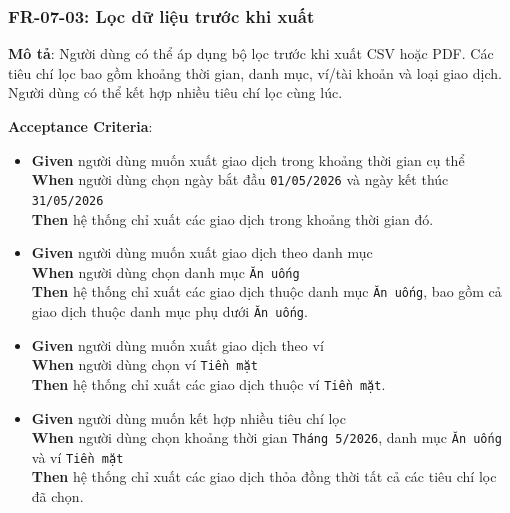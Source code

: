 \subsubsection{FR-07-03: Lọc dữ liệu trước khi xuất}

\textbf{Mô tả}: Người dùng có thể áp dụng bộ lọc trước khi xuất CSV hoặc PDF. Các tiêu chí lọc bao gồm khoảng thời gian, danh mục, ví/tài khoản và loại giao dịch. Người dùng có thể kết hợp nhiều tiêu chí lọc cùng lúc.



\textbf{Acceptance Criteria}:

\begin{itemize}
\item \textbf{Given} người dùng muốn xuất giao dịch trong khoảng thời gian cụ thể  \\ \hspace*{1.5em}  \textbf{When} người dùng chọn ngày bắt đầu \texttt{01/05/2026} và ngày kết thúc \texttt{31/05/2026}  \\ \hspace*{1.5em}  \textbf{Then} hệ thống chỉ xuất các giao dịch trong khoảng thời gian đó.
\item \textbf{Given} người dùng muốn xuất giao dịch theo danh mục  \\ \hspace*{1.5em}  \textbf{When} người dùng chọn danh mục \texttt{Ăn uống}  \\ \hspace*{1.5em}  \textbf{Then} hệ thống chỉ xuất các giao dịch thuộc danh mục \texttt{Ăn uống}, bao gồm cả giao dịch thuộc danh mục phụ dưới \texttt{Ăn uống}.
\item \textbf{Given} người dùng muốn xuất giao dịch theo ví  \\ \hspace*{1.5em}  \textbf{When} người dùng chọn ví \texttt{Tiền mặt}  \\ \hspace*{1.5em}  \textbf{Then} hệ thống chỉ xuất các giao dịch thuộc ví \texttt{Tiền mặt}.
\item \textbf{Given} người dùng muốn kết hợp nhiều tiêu chí lọc  \\ \hspace*{1.5em}  \textbf{When} người dùng chọn khoảng thời gian \texttt{Tháng 5/2026}, danh mục \texttt{Ăn uống} và ví \texttt{Tiền mặt}  \\ \hspace*{1.5em}  \textbf{Then} hệ thống chỉ xuất các giao dịch thỏa đồng thời tất cả các tiêu chí lọc đã chọn.

\end{itemize}
